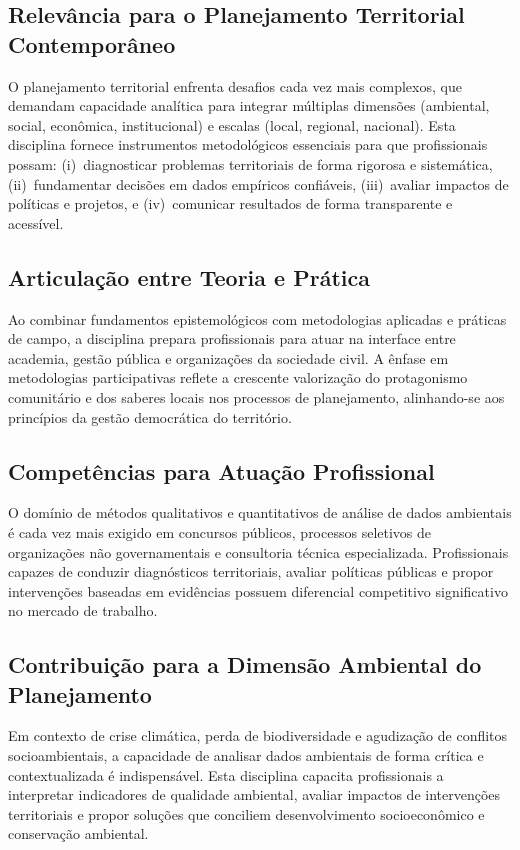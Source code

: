 \documentclass[11pt,a4paper]{article}
\begin{document}
\subsection*{Relevância para o Planejamento Territorial Contemporâneo}
O planejamento territorial enfrenta desafios cada vez mais complexos, que demandam capacidade analítica para integrar múltiplas dimensões (ambiental, social, econômica, institucional) e escalas (local, regional, nacional). Esta disciplina fornece instrumentos metodológicos essenciais para que profissionais possam: (i)~diagnosticar problemas territoriais de forma rigorosa e sistemática, (ii)~fundamentar decisões em dados empíricos confiáveis, (iii)~avaliar impactos de políticas e projetos, e (iv)~comunicar resultados de forma transparente e acessível.

\subsection*{Articulação entre Teoria e Prática}
Ao combinar fundamentos epistemológicos com metodologias aplicadas e práticas de campo, a disciplina prepara profissionais para atuar na interface entre academia, gestão pública e organizações da sociedade civil. A ênfase em metodologias participativas reflete a crescente valorização do protagonismo comunitário e dos saberes locais nos processos de planejamento, alinhando-se aos princípios da gestão democrática do território.

\subsection*{Competências para Atuação Profissional}
O domínio de métodos qualitativos e quantitativos de análise de dados ambientais é cada vez mais exigido em concursos públicos, processos seletivos de organizações não governamentais e consultoria técnica especializada. Profissionais capazes de conduzir diagnósticos territoriais, avaliar políticas públicas e propor intervenções baseadas em evidências possuem diferencial competitivo significativo no mercado de trabalho.

\subsection*{Contribuição para a Dimensão Ambiental do Planejamento}
Em contexto de crise climática, perda de biodiversidade e agudização de conflitos socioambientais, a capacidade de analisar dados ambientais de forma crítica e contextualizada é indispensável. Esta disciplina capacita profissionais a interpretar indicadores de qualidade ambiental, avaliar impactos de intervenções territoriais e propor soluções que conciliem desenvolvimento socioeconômico e conservação ambiental.
\end{document}
